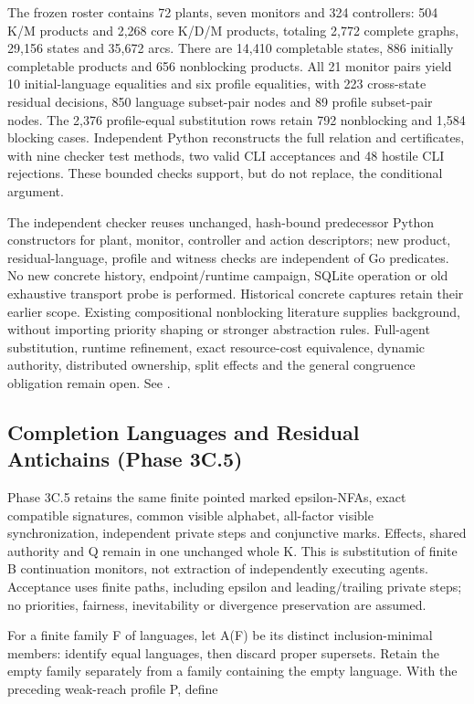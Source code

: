 \documentclass[11pt,a4paper]{article}
\theoremstyle{definition}
\theoremstyle{remark}
\begin{document}
The frozen roster contains 72 plants, seven monitors and 324 controllers: 504 K/M products and 2,268 core K/D/M products, totaling 2,772 complete graphs, 29,156 states and 35,672 arcs. There are 14,410 completable states, 886 initially completable products and 656 nonblocking products. All 21 monitor pairs yield 10 initial-language equalities and six profile equalities, with 223 cross-state residual decisions, 850 language subset-pair nodes and 89 profile subset-pair nodes. The 2,376 profile-equal substitution rows retain 792 nonblocking and 1,584 blocking cases. Independent Python reconstructs the full relation and certificates, with nine checker test methods, two valid CLI acceptances and 48 hostile CLI rejections. These bounded checks support, but do not replace, the conditional argument.

The independent checker reuses unchanged, hash-bound predecessor Python constructors for plant, monitor, controller and action descriptors; new product, residual-language, profile and witness checks are independent of Go predicates. No new concrete history, endpoint/runtime campaign, SQLite operation or old exhaustive transport probe is performed. Historical concrete captures retain their earlier scope. Existing compositional nonblocking literature supplies background, without importing priority shaping or stronger abstraction rules. Full-agent substitution, runtime refinement, exact resource-cost equivalence, dynamic authority, distributed ownership, split effects and the general congruence obligation remain open. See .

\subsection{Completion Languages and Residual Antichains (Phase 3C.5)}

Phase 3C.5 retains the same finite pointed marked epsilon-NFAs, exact compatible signatures, common visible alphabet, all-factor visible synchronization, independent private steps and conjunctive marks. Effects, shared authority and Q remain in one unchanged whole K. This is substitution of finite B continuation monitors, not extraction of independently executing agents. Acceptance uses finite paths, including epsilon and leading/trailing private steps; no priorities, fairness, inevitability or divergence preservation are assumed.

For a finite family F of languages, let A(F) be its distinct inclusion-minimal members: identify equal languages, then discard proper supersets. Retain the empty family separately from a family containing the empty language. With the preceding weak-reach profile P, define
\end{document}
